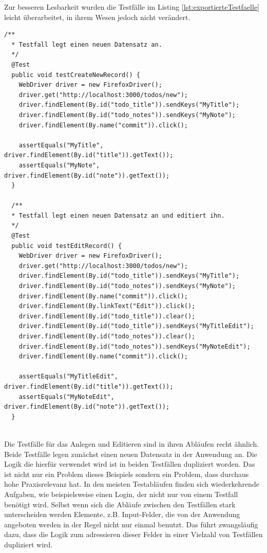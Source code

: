 Zur besseren Lesbarkeit wurden die Testfälle im Listing \ref{lst:exportierteTestfaelle} leicht überarbeitet, in ihrem Wesen jedoch nicht verändert.
\begin{lstlisting}[caption={Exportierte Testfälle},label={lst:exportierteTestfaelle}]
  /**
  * Testfall legt einen neuen Datensatz an.
  */
  @Test
  public void testCreateNewRecord() {
    WebDriver driver = new FirefoxDriver();
    driver.get("http://localhost:3000/todos/new");
    driver.findElement(By.id("todo_title")).sendKeys("MyTitle");
    driver.findElement(By.id("todo_notes")).sendKeys("MyNote");
    driver.findElement(By.name("commit")).click();
  
    assertEquals("MyTitle", driver.findElement(By.id("title")).getText());
    assertEquals("MyNote", driver.findElement(By.id("note")).getText());
  }
  
  /**
  * Testfall legt einen neuen Datensatz an und editiert ihn.
  */
  @Test
  public void testEditRecord() {
    WebDriver driver = new FirefoxDriver();
    driver.get("http://localhost:3000/todos/new");
    driver.findElement(By.id("todo_title")).sendKeys("MyTitle");
    driver.findElement(By.id("todo_notes")).sendKeys("MyNote");
    driver.findElement(By.name("commit")).click();
    driver.findElement(By.linkText("Edit")).click();
    driver.findElement(By.id("todo_title")).clear();
    driver.findElement(By.id("todo_title")).sendKeys("MyTitleEdit");
    driver.findElement(By.id("todo_notes")).clear();
    driver.findElement(By.id("todo_notes")).sendKeys("MyNoteEdit");
    driver.findElement(By.name("commit")).click();
    
    assertEquals("MyTitleEdit", driver.findElement(By.id("title")).getText());
    assertEquals("MyNoteEdit", driver.findElement(By.id("note")).getText());
  }
  
\end{lstlisting}
Die Testfälle für das Anlegen und Editieren sind in ihren Abläufen recht ähnlich. Beide Testfälle legen zunächst einen neuen Datensatz in der Anwendung an. Die Logik die hierfür verwendet wird ist in beiden Testfällen dupliziert worden. Das ist nicht nur ein Problem dieses Beispiels sondern ein Problem, dass durchaus hohe Praxisrelevanz hat. In den meisten Testabläufen finden sich wiederkehrende Aufgaben, wie beispielsweise einen Login, der nicht nur von einem Testfall benötigt wird.
Selbst wenn sich die Abläufe zwischen den Testfällen stark unterscheiden werden Elemente, z.B. Input-Felder, die von der Anwendung angeboten werden in der Regel nicht nur einmal benutzt. Das führt zwangsläufig dazu, dass die Logik zum adressieren dieser Felder in einer Vielzahl von Testfällen dupliziert wird.\\
